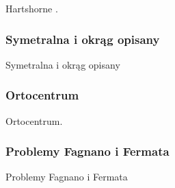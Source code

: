 Hartshorne \cite[s. 58]{hartshorne2000}.



\subsubsection{Symetralna i okrąg opisany}
Symetralna i okrąg opisany
\loremipsum

\subsubsection{Ortocentrum}
Ortocentrum.
\loremipsum





\loremipsum

\subsubsection{Problemy Fagnano i Fermata}
Problemy Fagnano i Fermata
\loremipsum